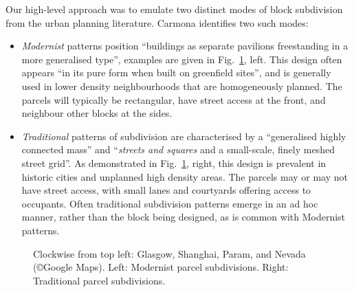 
Our high-level approach was to emulate two distinct modes of block subdivision from the urban planning literature. Carmona\cite{carmona2003:PP} identifies two such modes:

\begin{itemize}
\item \emph{Modernist} patterns position ``buildings as separate pavilions freestanding in a more generalised type'', examples are given in Fig.~\ref{fig:parcelTypes}, left. This design often appears ``in its pure form when built on greenfield sites'', and is generally used in lower density neighbourhoods that are homogeneously planned. The parcels will typically be rectangular, have street access at the front, and neighbour other blocks at the sides.
\item \emph{Traditional} patterns of subdivision are characterised by a ``generalised highly connected mass'' and ``\emph{streets and squares} and a small-scale, finely meshed street grid''. As demonstrated in Fig.~\ref{fig:parcelTypes}, right, this design is prevalent in historic cities and unplanned high density areas. The parcels may or may not have street access, with small lanes and courtyards offering access to occupants. Often traditional subdivision patterns emerge in an ad hoc manner, rather than the block being designed, as is common with Modernist patterns. 
\end{itemize}

\begin{figure}
\centering
\def\svgwidth{1.\columnwidth}

\caption[Two parcel types]{\label{fig:parcelTypes} Clockwise from top left: Glasgow, Shanghai, Param, and Nevada (\copyright Google Maps). Left: Modernist parcel subdivisions. Right: Traditional parcel subdivisions.}
\end{figure}


